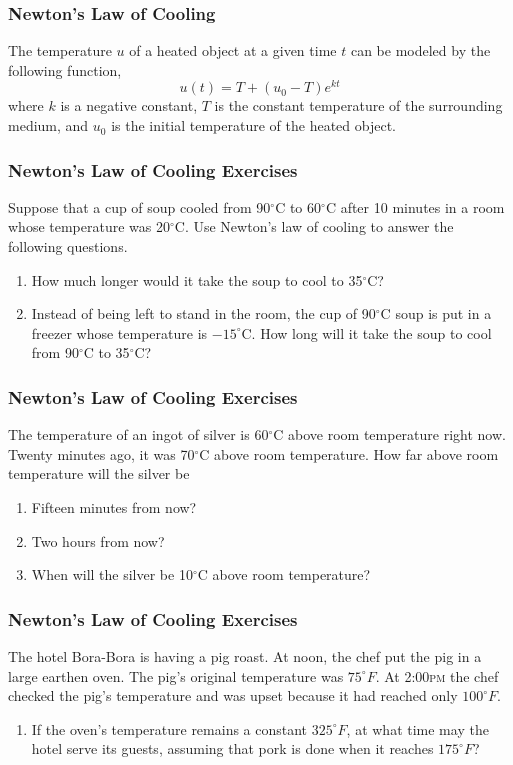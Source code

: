 \documentclass[xcolor=dvipsnames]{beamer}
\begin{document}
\begin{frame}
  \frametitle{Newton's Law of Cooling}
The temperature $u$ of a heated object at a given time $t$ can be
modeled by the following function,
\begin{equation}
  \label{eq:iemahbec}
  u(t)=T+(u_{0}-T)e^{kt}
\end{equation}
where $k$ is a negative constant, $T$ is the constant temperature of
the surrounding medium, and $u_{0}$ is the initial temperature of the
heated object.
\end{frame}

\begin{frame}
  \frametitle{Newton's Law of Cooling Exercises}
{\ubung} Suppose that a cup of soup cooled from 90$^{\circ}$C to 60$^{\circ}$C
after 10 minutes in a room whose temperature was 20$^{\circ}$C. Use Newton's
law of cooling to answer the following questions.
\begin{enumerate}
\item How much longer would it take the soup to cool to 35$^{\circ}$C?
\item Instead of being left to stand in the room, the cup of 90$^{\circ}$C soup
  is put in a freezer whose temperature is $-15^{\circ}$C. How long will it
  take the soup to cool from 90$^{\circ}$C to 35$^{\circ}$C?
\end{enumerate}
\end{frame}

\begin{frame}
  \frametitle{Newton's Law of Cooling Exercises}
  {\ubung} The temperature of an ingot of silver is 60$^{\circ}$C above room
  temperature right now. Twenty minutes ago, it was 70$^{\circ}$C above room
  temperature. How far above room temperature will the silver be
  \begin{enumerate}
  \item Fifteen minutes from now? 
  \item Two hours from now? 
  \item When will the silver be 10$^{\circ}$C above room temperature? 
  \end{enumerate}
\end{frame}

\begin{frame}
  \frametitle{Newton's Law of Cooling Exercises}
  {\ubung} The hotel Bora-Bora is having a pig roast. At noon, the chef put the
  pig in a large earthen oven. The pig's original temperature was
  $75^{\circ}F$. At 2:00\textsc{pm} the chef checked the pig's
  temperature and was upset because it had reached only
  $100^{\circ}F$.
\begin{enumerate}
\item If the oven's temperature remains a constant $325^{\circ}F$, at
  what time may the hotel serve its guests, assuming that pork is done
  when it reaches $175^{\circ}F$?
\end{enumerate}
\end{frame}
\end{document}
